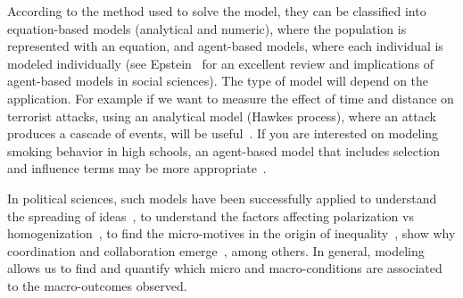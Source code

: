 According to the method used to solve the model, they can be classified into
equation-based models (analytical and numeric), where the population is represented with an equation,
and agent-based models, where each individual is modeled individually (see Epstein~\citep{Epstein2006} for an excellent review and implications of agent-based models in social sciences).
The type of model will depend on the application.
For example if we want to measure the effect of time and distance on terrorist attacks,
using an analytical model (Hawkes process), where an attack produces a cascade of events, will be useful~\citep{garciab2015}.
If you are interested on modeling smoking behavior in high schools,
an agent-based model that includes selection and influence terms may be more appropriate~\citep{Mercken2010}.


In political sciences, such models have been successfully applied to understand the spreading of ideas~\citep{rosenquist2010spread}, %
to understand the factors affecting polarization vs homogenization~\citep{macy2003polarization},
to find the micro-motives in the origin of inequality~\cite{Clauset2015}, 
show why coordination and collaboration emerge~\citep{thompson1991markets},
among others. 
In general, modeling allows us to find and quantify which micro and macro-conditions are associated to the macro-outcomes observed.





